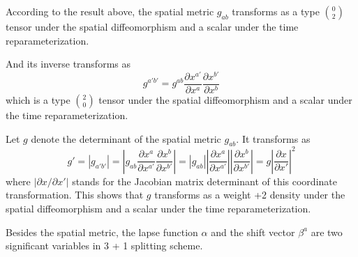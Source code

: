 \documentclass[letterpaper,nofootinbib,prd,amsmath,onecolumn]{revtex4-1}
\begin{document}
According to the result above, the spatial metric $g_{ab}$ transforms as a type $0 \choose 2$ tensor under the spatial diffeomorphism and a scalar under the time reparameterization.

 
And its inverse transforms as
\begin{equation}
g^{a'b'} = g^{ab}\frac{\partial x^{a'}}{\partial x^{a}}\frac{\partial x^{b'}}{\partial x^{b}}\label{spatial metric}
\end{equation}
which is a type $2 \choose 0$ tensor under the spatial diffeomorphism and a scalar under the time reparameterization. 


Let $g$ denote the determinant of the spatial metric $g_{ab}$. It transforms as
\begin{equation}
g' = |g_{a'b'}| = |g_{ab}\frac{\partial x^{a}}{\partial x^{a'}}\frac{\partial x^{b}}{\partial x^{b'}}| = |g_{ab}||\frac{\partial x^{a}}{\partial x^{a'}}||\frac{\partial x^{b}}{\partial x^{b'}}| = g|\frac{\partial x}{\partial x'}|^{2}
\end{equation}
where $|\partial x/\partial x'|$ stands for the Jacobian matrix determinant of this coordinate transformation. This shows that $g$ transforms as a weight +2 density under the spatial diffeomorphism and a scalar under the time reparameterization. 
 
Besides the spatial metric, the lapse function $\alpha$ and the shift vector $\beta^{a}$ are two significant variables in 3 + 1 splitting scheme. 
\end{document}
